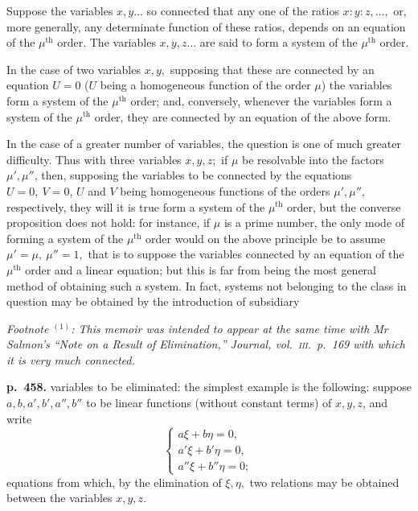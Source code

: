 \documentclass[11pt]{article}
\begin{document}
Suppose the variables $x, y \ldots$ so connected that any one of the ratios $x:y:z, \ldots,$ or, more generally, any determinate function of these ratios, depends on an equation of the $\mu^{\text{th}}$ order. The variables $x, y, z \ldots$ are said to form a system of the $\mu^{\text{th}}$ order.

In the case of two variables $x, y,$ supposing that these are connected by an equation $U = 0$ ($U$ being a homogeneous function of the order $\mu$) the variables form a system of the $\mu^{\text{th}}$ order; and, conversely, whenever the variables form a system of the $\mu^{\text{th}}$ order, they are connected by an equation of the above form.

In the case of a greater number of variables, the question is one of much greater difficulty. Thus with three variables $x, y, z;$ if $\mu$ be resolvable into the factors $\mu', \mu''$, then, supposing the variables to be connected by the equations $U = 0,\ V = 0$, $U$ and $V$ being homogeneous functions of the orders $\mu', \mu'',$ respectively, they will it is true form a system of the $\mu^{\text{th}}$ order, but the converse proposition does not hold: for instance, if $\mu$ is a prime number, the only mode of forming a system of the $\mu^{\text{th}}$ order would on the above principle be to assume $\mu' = \mu,\ \mu'' = 1,$ that is to suppose the variables connected by an equation of the $\mu^{\text{th}}$ order and a linear equation; but this is far from being the most general method of obtaining such a system. In fact, systems not belonging to the class in question may be obtained by the introduction of subsidiary

\noindent\textit{Footnote $^{(1)}$: This memoir was intended to appear at the same time with Mr Salmon's ``Note on a Result of Elimination,'' \textit{Journal}, vol.~\textsc{iii}.\ p.~169 with which it is very much connected.}

\bigskip
\noindent\textbf{p.~458.} variables to be eliminated: the simplest example is the following: suppose $a, b, a', b', a'', b''$ to be linear functions (without constant terms) of $x, y, z$, and write
\[ \begin{cases} a\xi + b\eta = 0,\\ a'\xi + b'\eta = 0,\\ a''\xi + b''\eta = 0; \end{cases} \]
equations from which, by the elimination of $\xi, \eta,$ two relations may be obtained between the variables $x, y, z$.
\end{document}
